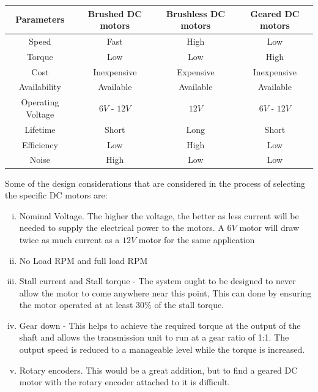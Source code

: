 \begin{table}[ht]
  \begin{center}
    \leavevmode
    \begin{tabular}{|c|c|c|c|}\hline
    Parameters & Brushed \ac{DC} motors & Brushless \ac{DC} motors & Geared \ac{DC} motors \\\hline
    Speed & Fast & High & Low \\\hline
    Torque & Low & Low & High \\\hline
    Cost & Inexpensive & Expensive & Inexpensive \\\hline
    Availability & Available & Available & Available \\\hline
    Operating Voltage & $6 V$ - $12 V$ & $12 V$ & $6 V$ - $12 V$ \\\hline
    Lifetime & Short & Long & Short \\\hline
    Efficiency & Low & High & Low \\\hline
    Noise & High & Low & Low \\\hline
    \end{tabular}
    \label{table:comparedifferentmotrs}
  \end{center}
\end{table}

Some of the design considerations that are considered in the process of selecting the specific \ac{DC} motors are:
\begin{enumerate}[i.]
    \item  Nominal Voltage. The higher the voltage, the better as less current will be needed to supply the electrical power to the motors. A $6 V$ motor will draw twice as much current as a $12 V$ motor for the same application 
    \item No Load \ac{RPM} and full load \ac{RPM}
    \item Stall current and Stall torque - The system ought to be designed to never allow the motor to come anywhere near this point, This can done by ensuring the motor operated at at least 30\% of the stall torque.
    \item Gear down - This helps to achieve the required torque at the output of the shaft and allows the transmission unit to run at a gear ratio of 1:1. The output speed is reduced to a manageable level while the torque is increased.
    \item Rotary encoders. This would be a great addition, but to find a geared \ac{DC} motor with the rotary encoder attached to it is difficult.
\end{enumerate}


